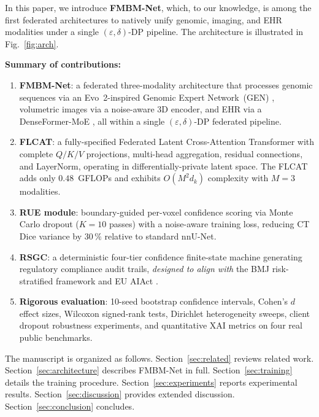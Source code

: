 \documentclass[a4paper,fleqn]{cas-dc}
\begin{document}
In this paper, we introduce \textbf{FMBM-Net}, which, to our knowledge, is among the first federated architectures to natively unify genomic, imaging, and EHR modalities under a single $(\varepsilon,\delta)$-DP pipeline. The architecture is illustrated in Fig.~\ref{fig:arch}.

\textbf{Summary of contributions:}
\begin{enumerate}
\item \textbf{FMBM-Net}: a federated three-modality architecture that processes
  genomic sequences via an Evo~2-inspired Genomic Expert Network~(GEN)
  \citep{evo2_2026}, volumetric images via a noise-aware 3D encoder, and EHR
  via a DenseFormer-MoE \citep{denseformer2024}, all within a single
  $(\varepsilon,\delta)$-DP federated pipeline.

\item \textbf{FLCAT}: a fully-specified Federated Latent Cross-Attention
  Transformer with complete $Q/K/V$ projections, multi-head aggregation,
  residual connections, and LayerNorm, operating in differentially-private
  latent space. The FLCAT adds only $0.48$~GFLOPs and exhibits
  $O(M^2 d_k)$ complexity with $M\!=\!3$ modalities.

\item \textbf{RUE module}: boundary-guided per-voxel confidence scoring via Monte Carlo dropout ($K\!=\!10$ passes) with a noise-aware training loss, reducing CT Dice variance by $30\,\%$ relative to standard nnU-Net.

\item \textbf{RSGC}: a deterministic four-tier confidence finite-state machine
  generating regulatory compliance audit trails, \emph{designed to align with} the BMJ risk-stratified framework \citep{bmj_governance_2026} and EU AIAct \citep{eu_ai_act_2024}.

\item \textbf{Rigorous evaluation}: 10-seed bootstrap confidence intervals, Cohen's $d$ effect sizes, Wilcoxon signed-rank tests, Dirichlet heterogeneity sweeps, client dropout robustness experiments, and quantitative XAI metrics on four real public benchmarks.
\end{enumerate}

The manuscript is organized as follows.
Section~\ref{sec:related} reviews related work.
Section~\ref{sec:architecture} describes FMBM-Net in full.
Section~\ref{sec:training} details the training procedure.
Section~\ref{sec:experiments} reports experimental results.
Section~\ref{sec:discussion} provides extended discussion.
Section~\ref{sec:conclusion} concludes.
\end{document}
